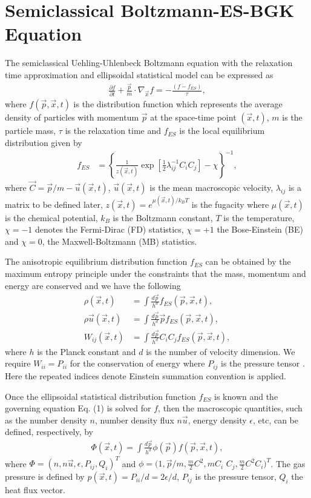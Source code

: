 \documentclass[doublecol]{epl2}
\begin{document}
\section{Semiclassical Boltzmann-ES-BGK Equation}

The semiclassical Uehling-Uhlenbeck Boltzmann equation with the relaxation time approximation and ellipsoidal statistical model can be expressed as
\begin{align}
\frac{\partial f}{\partial t} + \frac{\vec p}{m} \cdot \nabla_{\vec x} f  =  -\frac{(f - f_{ES})}{\tau},
\end{align}
where  $f(\vec p, \vec x, t)$ is the distribution function which represents the average density of particles with momentum $\vec p$ at the space-time point $(\vec x, t)$, $m$ is the particle mass, $\tau$ is the relaxation time and $f_{ES}$ is the local equilibrium distribution given by
\begin{align}
f_{ES} &=\left\{ \frac{1}{z(\vec x,t)} \exp[ \frac{1}{2} \lambda_{i j}^{-1} C_{i} C_{j} ] - \chi \right\}^{-1},
\end{align}
where $\vec C=\vec p/m -\vec u(\vec x,t)$, $\vec u(\vec x,t)$ is the mean macroscopic velocity, $\lambda_{i j}$ is a matrix to be defined later, $z(\vec x, t)= e^{ \mu(\vec x, t) /k_B T }$ is the fugacity where $\mu(\vec x,t)$ is the chemical potential, $k_B$ is the Boltzmann constant, $T$ is the temperature, $\chi = -1$ denotes the Fermi-Dirac (FD) statistics, $\chi = +1$ the Bose-Einstein (BE) and $\chi = 0$, the Maxwell-Boltzmann (MB) statistics.

The anisotropic equilibrium distribution function $f_{ES}$ can be obtained by the maximum entropy principle under the constraints that the mass, momentum and energy are conserved and we have the following
\begin{align}
\rho(\vec x, t) &= \int \frac{d \vec p}{h^d}   f_{ES}(\vec p, \vec x, t), \\
\rho \vec u(\vec x, t) &= \int \frac{d \vec p}{h^d} \vec p  f_{ES}(\vec p, \vec x, t), \\
W_{i j}(\vec x, t) &= \int \frac{d \vec p}{h^d} C_{i} C_{j} f_{ES}(\vec p, \vec x, t),
\end{align}
where $h$ is the Planck constant and $d$ is the number of velocity dimension. We require $W_{i i}=P_{i i}$ for the conservation of energy where $P_{ij}$ is the pressure tensor \cite{Wu2012}.  Here the repeated indices denote Einstein summation convention is applied.

Once the ellipsoidal statistical distribution function $f_{ES}$ is known and the governing equation Eq. (1) is solved for $f$, then the macroscopic quantities, such as the number density $n$, number density flux $n\vec u$, energy density $\epsilon$, etc, can be defined, respectively, by
\begin{align}
\Phi (\vec x, t) = \int \frac{d \vec p }{ h^d} \phi(\vec p) f(\vec p, \vec x, t),
\end{align}
where $\Phi = (n, n\vec u, \epsilon, P_{ij}, Q_{i})^T$ and $\phi = (1, \vec p/m, \frac{m}{2} C^2, m C_{i} $ $C_{j}, \frac{m}{2}C^2 C_{i} )^T$.  The gas pressure is defined by $p(\vec x, t) = P_{i i}/d = 2 \epsilon /d$, $P_{ij}$ is the pressure tensor, $Q_{i}$ the heat flux vector.
\end{document}
